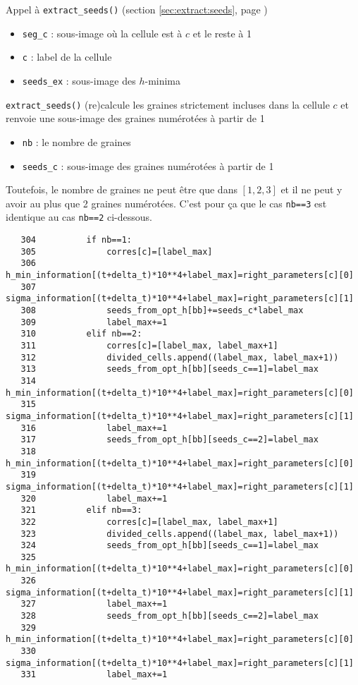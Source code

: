 \documentclass{article}
\def \mycolor {red}
\begin{document}
\color{\mycolor}
Appel \`a \texttt{extract\_seeds()} (section \ref{sec:extract:seeds}, page \pageref{sec:extract:seeds})
\begin{itemize}
\itemsep -0.5ex
\item \verb|seg_c| : sous-image o\`u la cellule est \`a $c$ et le reste \`a 1
\item \verb|c| : label de la cellule
\item \verb|seeds_ex| : sous-image des $h$-minima
\end{itemize}
\texttt{extract\_seeds()} (re)calcule les graines strictement incluses dans la cellule $c$ et renvoie une sous-image des graines num\'erot\'ees \`a partir de 1
\begin{itemize}
\itemsep -0.5ex
\item \verb|nb| : le nombre de graines
\item \verb|seeds_c| : sous-image des graines num\'erot\'ees \`a partir de 1
\end{itemize}
Toutefois, le nombre de graines ne peut \^etre que dans $[1,2,3]$ et il ne peut y avoir au plus que 2 graines num\'erot\'ees. C'est pour \c{c}a que le cas \verb|nb==3| est identique au cas \verb|nb==2| ci-dessous.
\color{black}
\begin{verbatim}   
   304	        if nb==1:
   305	            corres[c]=[label_max]
   306	            h_min_information[(t+delta_t)*10**4+label_max]=right_parameters[c][0]
   307	            sigma_information[(t+delta_t)*10**4+label_max]=right_parameters[c][1]
   308	            seeds_from_opt_h[bb]+=seeds_c*label_max
   309	            label_max+=1
   310	        elif nb==2:
   311	            corres[c]=[label_max, label_max+1]
   312	            divided_cells.append((label_max, label_max+1))
   313	            seeds_from_opt_h[bb][seeds_c==1]=label_max
   314	            h_min_information[(t+delta_t)*10**4+label_max]=right_parameters[c][0]
   315	            sigma_information[(t+delta_t)*10**4+label_max]=right_parameters[c][1]
   316	            label_max+=1
   317	            seeds_from_opt_h[bb][seeds_c==2]=label_max
   318	            h_min_information[(t+delta_t)*10**4+label_max]=right_parameters[c][0]
   319	            sigma_information[(t+delta_t)*10**4+label_max]=right_parameters[c][1]
   320	            label_max+=1
   321	        elif nb==3:
   322	            corres[c]=[label_max, label_max+1]
   323	            divided_cells.append((label_max, label_max+1))
   324	            seeds_from_opt_h[bb][seeds_c==1]=label_max
   325	            h_min_information[(t+delta_t)*10**4+label_max]=right_parameters[c][0]
   326	            sigma_information[(t+delta_t)*10**4+label_max]=right_parameters[c][1]
   327	            label_max+=1
   328	            seeds_from_opt_h[bb][seeds_c==2]=label_max
   329	            h_min_information[(t+delta_t)*10**4+label_max]=right_parameters[c][0]
   330	            sigma_information[(t+delta_t)*10**4+label_max]=right_parameters[c][1]
   331	            label_max+=1
\end{verbatim} 
\end{document}
